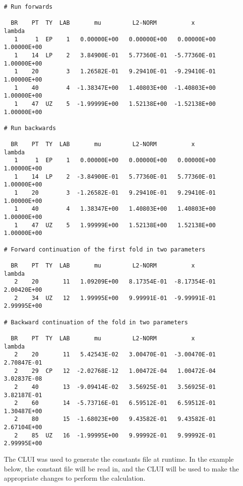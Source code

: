 \documentclass[12pt]{report}
\begin{document}
\begin{center}
\vspace{-0.2in}
\begin{verbatim}
# Run forwards
 
  BR    PT  TY  LAB       mu         L2-NORM          x           lambda    
   1     1  EP    1   0.00000E+00   0.00000E+00   0.00000E+00   1.00000E+00
   1    14  LP    2   3.84900E-01   5.77360E-01  -5.77360E-01   1.00000E+00
   1    20        3   1.26582E-01   9.29410E-01  -9.29410E-01   1.00000E+00
   1    40        4  -1.38347E+00   1.40803E+00  -1.40803E+00   1.00000E+00
   1    47  UZ    5  -1.99999E+00   1.52138E+00  -1.52138E+00   1.00000E+00

# Run backwards
 
  BR    PT  TY  LAB       mu         L2-NORM          x           lambda    
   1     1  EP    1   0.00000E+00   0.00000E+00   0.00000E+00   1.00000E+00
   1    14  LP    2  -3.84900E-01   5.77360E-01   5.77360E-01   1.00000E+00
   1    20        3  -1.26582E-01   9.29410E-01   9.29410E-01   1.00000E+00
   1    40        4   1.38347E+00   1.40803E+00   1.40803E+00   1.00000E+00
   1    47  UZ    5   1.99999E+00   1.52138E+00   1.52138E+00   1.00000E+00

# Forward continuation of the first fold in two parameters
 
  BR    PT  TY  LAB       mu         L2-NORM          x           lambda    
   2    20       11   1.09209E+00   8.17354E-01  -8.17354E-01   2.00420E+00
   2    34  UZ   12   1.99995E+00   9.99991E-01  -9.99991E-01   2.99995E+00

# Backward continuation of the fold in two parameters

  BR    PT  TY  LAB       mu         L2-NORM          x           lambda    
   2    20       11   5.42543E-02   3.00470E-01  -3.00470E-01   2.70847E-01
   2    29  CP   12  -2.02768E-12   1.00472E-04   1.00472E-04   3.02837E-08
   2    40       13  -9.09414E-02   3.56925E-01   3.56925E-01   3.82187E-01
   2    60       14  -5.73716E-01   6.59512E-01   6.59512E-01   1.30487E+00
   2    80       15  -1.68023E+00   9.43582E-01   9.43582E-01   2.67104E+00
   2    85  UZ   16  -1.99995E+00   9.99992E-01   9.99992E-01   2.99995E+00

\end{verbatim}
\end{center}

The CLUI was used to generate the constants
file at runtime.  In the example below, the constant file 
will be read in, and the CLUI will be used to make the appropriate
changes to perform the calculation.
\end{document}
